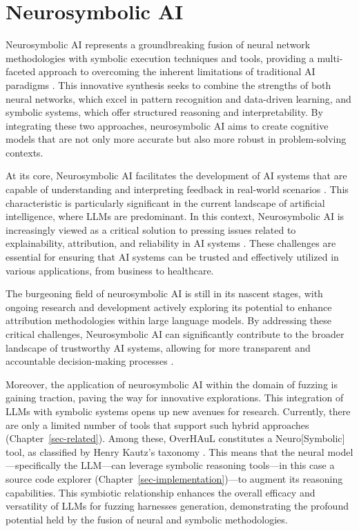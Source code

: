 \documentclass[
  a4paper,
]{scrreprt}
\theoremstyle{definition}
\theoremstyle{remark}
\begin{document}
\section{Neurosymbolic AI}\label{sec-nesy}

Neurosymbolic AI represents a groundbreaking fusion of neural network
methodologies with symbolic execution techniques and tools, providing a
multi-faceted approach to overcoming the inherent limitations of
traditional AI paradigms \autocite{sheth2023,garcez2020}. This
innovative synthesis seeks to combine the strengths of both neural
networks, which excel in pattern recognition and data-driven learning,
and symbolic systems, which offer structured reasoning and
interpretability. By integrating these two approaches, neurosymbolic AI
aims to create cognitive models that are not only more accurate but also
more robust in problem-solving contexts.

At its core, Neurosymbolic AI facilitates the development of AI systems
that are capable of understanding and interpreting feedback in
real-world scenarios \autocite{ganguly2024}. This characteristic is
particularly significant in the current landscape of artificial
intelligence, where LLMs are predominant. In this context, Neurosymbolic
AI is increasingly viewed as a critical solution to pressing issues
related to explainability, attribution, and reliability in AI systems
\autocite{gaur2023,tilwani2024}. These challenges are essential for
ensuring that AI systems can be trusted and effectively utilized in
various applications, from business to healthcare.

The burgeoning field of neurosymbolic AI is still in its nascent stages,
with ongoing research and development actively exploring its potential
to enhance attribution methodologies within large language models. By
addressing these critical challenges, Neurosymbolic AI can significantly
contribute to the broader landscape of trustworthy AI systems, allowing
for more transparent and accountable decision-making processes
\autocite{sheth2023,gaur2023,tilwani2024}.

Moreover, the application of neurosymbolic AI within the domain of
fuzzing is gaining traction, paving the way for innovative explorations.
This integration of LLMs with symbolic systems opens up new avenues for
research. Currently, there are only a limited number of tools that
support such hybrid approaches (Chapter~\ref{sec-related}). Among these,
OverHAuL constitutes a Neuro{[}Symbolic{]} tool, as classified by Henry
Kautz's taxonomy \autocite{sarker2022,kautz2020}. This means that the
neural model---specifically the LLM---can leverage symbolic reasoning
tools---in this case a source code explorer
(Chapter~\ref{sec-implementation})---to augment its reasoning
capabilities. This symbiotic relationship enhances the overall efficacy
and versatility of LLMs for fuzzing harnesses generation, demonstrating
the profound potential held by the fusion of neural and symbolic
methodologies.
\end{document}
